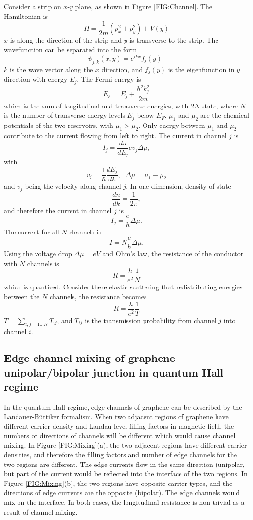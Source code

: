 \documentclass[pdflatex, sectionletters, 12pt]{pittetd}    %
\begin{document}
Consider a strip on $x$-$y$ plane, as shown in Figure \ref{FIG:Channel}. The Hamiltonian is
$$
H = \frac{1}{2m}\left(p_x^2 + p_y^2\right) + V(y)
$$ 
$x$ is along the direction of the strip and $y$ is transverse to the strip. The wavefunction can be separated into the form
$$
\psi_{j, k}(x, y) = e^{ikx} f_j(y),
$$
$k$ is the wave vector along the $x$ direction, and $f_j(y)$ is the eigenfunction in $y$ direction with energy $E_j$. The Fermi energy is 
$$
E_F = E_j + \frac{\hbar^2 k_j^2}{2m}
$$
which is the sum of longitudinal and transverse energies, with 2$N$ state, where $N$ is the number of transverse energy levels $E_j$ below $E_F$. $\mu_1$ and $\mu_2$ are the chemical potentials of the two reservoirs, with $\mu_1 > \mu_2$. Only energy between $\mu_1$ and $\mu_2$ contribute to the current flowing from left to right. The current in channel $j$ is 
$$
I_j = \frac{dn}{dE_j}ev_j\Delta\mu,
$$
with 
$$
v_j = \frac{1}{\hbar}\frac{dE_j}{dk}, \ \ \ \Delta \mu = \mu_1 - \mu_2
$$
and $v_j$ being the velocity along channel $j$. In one dimension, density of state
$$
\frac{dn}{dk} = \frac{1}{2\pi},
$$
and therefore the current in channel $j$ is
$$
I_j = \frac{e}{h}\Delta\mu.
$$
The current for all $N$ channels is
$$I = N\frac{e}{h}\Delta\mu.$$
Using the voltage drop $\Delta \mu = eV$ and Ohm's law, the resistance of the conductor with $N$ channels is
$$
R = \frac{h}{e^2}\frac{1}{N}
$$ 
which is quantized. Consider there elastic scattering that redistributing energies between the $N$ channels, the resistance becomes\cite{buttiker1988absence}
$$
R = \frac{h}{e^2}\frac{1}{T}
$$
$T = \sum_{i,j=1\ldots N} T_{ij}$, and $T_{ij}$ is the transmission probability from channel $j$ into channel $i$. 

\subsection{Edge channel mixing of graphene unipolar/bipolar junction in quantum Hall regime}

In the quantum Hall regime, edge channels of graphene can be described by the Landauer-B{\"u}ttiker formalism. When two adjacent regions of graphene have different carrier density and Landau level filling factors in magnetic field, the numbers or directions of channels will be different which would cause channel mixing. In Figure \ref{FIG:Mixing}(a), the two adjacent regions have different carrier densities, and therefore the filling factors and number of edge channels for the two regions are different. The edge currents flow in the same direction (unipolar, but part of the current would be reflected into the interface of the two regions. In Figure \ref{FIG:Mixing}(b), the two regions have opposite carrier types, and the directions of edge currents are the opposite (bipolar). The edge channels would mix on the interface. In both cases, the longitudinal resistance is non-trivial as a result of channel mixing.
\end{document}
